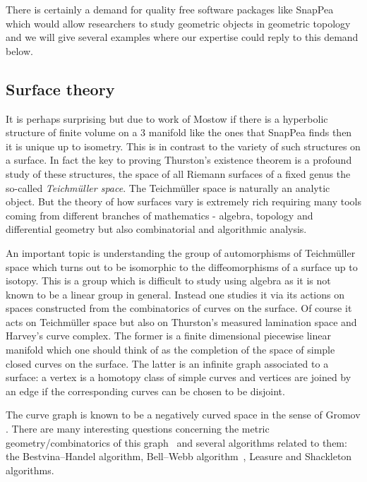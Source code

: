 \documentclass[14pt,fleqn]{article}
\begin{document}
There is certainly a demand for quality free software packages  like SnapPea  which  would allow researchers 
to study geometric objects 
in geometric topology
and 
we will give several examples 
where our expertise could 
reply to this demand below. 



\subsection{Surface theory}


It is perhaps surprising but due to work of Mostow \cite{mostow}
if there is a hyperbolic structure of finite volume on a 3 manifold like the ones that SnapPea finds 
then it is unique up to isometry.
This is in contrast 
to the variety of such structures 
on a surface.
In fact the key to proving Thurston's existence
theorem is a profound study of these 
structures, the
space of all Riemann surfaces of a fixed genus
the so-called \textit{Teichm\"{u}ller space}.
The Teichm\"{u}ller space is naturally an analytic object.
But the theory of
how surfaces vary is extremely rich 
requiring many tools coming
from different branches of mathematics - algebra, topology and
differential geometry but also combinatorial and algorithmic analysis.



An important topic is understanding
the group of automorphisms of 
Teichm\"{u}ller space 
which turns out to be isomorphic to 
the diffeomorphisms of a surface
up to isotopy. 
This is a group which 
is difficult to study using algebra
as it is not known 
to be a linear group in general.
Instead one studies it via its actions on
spaces constructed 
from the combinatorics of curves on the surface. 
Of course  it acts on Teichm\"{u}ller space
but also on 
Thurston’s measured
lamination space \cite{FLP}
 and Harvey’s curve complex. 
The former is a finite dimensional 
piecewise linear manifold 
which one should think of 
as the completion of the space of 
simple closed curves on the surface.
The latter is an infinite
graph associated to a surface: a vertex is a homotopy class of simple
curves and vertices are joined by an edge if the corresponding curves
can be chosen to be disjoint. 


The curve graph is known to be a negatively curved 
space in the sense of Gromov \cite{MM}.
There are many interesting questions
concerning the metric geometry/combinatorics of this graph~\cite{bmm-egead-16} and several
algorithms related to them: the Bestvina–Handel algorithm, Bell–Webb
algorithm~\cite{bw-ptacg-16}, Leasure and Shackleton algorithms.
\end{document}
